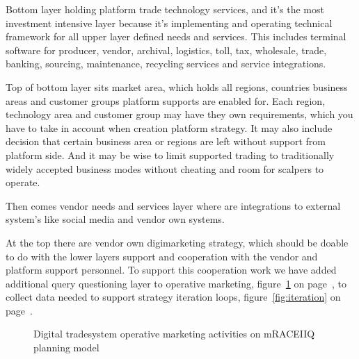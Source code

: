 Bottom layer holding platform trade technology services, and it's the most
investment intensive layer because it's implementing and operating technical
framework for all upper layer defined needs and services. This includes
terminal software for producer, vendor, archival, logistics, toll, tax,
wholesale, trade, banking, sourcing, maintenance, recycling services and
service integrations.

Top of bottom layer sits market area, which holds all regions, countries
business areas and customer groups platform supports are enabled for. Each
region, technology area and customer group may have they own requirements,
which you have to take in account when creation platform strategy. It may also
include decision that certain business area or regions are left without
support from platform side. And it may be wise to limit supported trading to
traditionally widely accepted business modes without cheating and room for
scalpers to operate.

Then comes vendor needs and services layer where are integrations to external
system's like social media and vendor own systems.

At the top there are vendor own digimarketing strategy, which should be
doable to do with the lower layers support and cooperation with the vendor
and platform support personnel. To support this cooperation work we have
added additional query questioning layer to operative marketing,
figure~\ref{fig:mRACEIIQ} on page~\pageref{fig:mRACEIIQ}, to collect data
needed to support strategy iteration loops, figure~\ref{fig:iteration} on
page~\pageref{fig:iteration}.


\begin{figure}
 \begin{center}
  \caption{Digital tradesystem operative marketing activities on mRACEIIQ
  planning model}\label{fig:mRACEIIQ}
 \end{center}
\end{figure}


